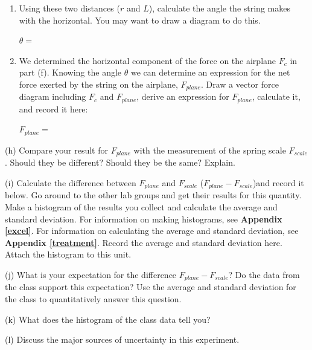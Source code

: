 \begin{enumerate}
\item Using these two distances ($r$ and $L$), 
calculate the angle the string makes with
the horizontal. You may want to draw a diagram to do this. 

\bigskip
\( \theta  =\)  \vspace{5mm}

\item We determined the horizontal component of the force on the airplane 
\( F_{c} \) in part (f). Knowing the angle \( \theta \) we can determine an
expression for the
net force exerted by the string on the airplane, \( F_{plane} \). Draw a vector
force diagram including \( F_{c} \) and \( F_{plane} \), derive an expression
for \( F_{plane} \), calculate it, and record it here: 

\bigskip
\( F_{plane} =\)  \vspace{10mm}

\end{enumerate}
(h) Compare your result for \( F_{plane} \) with the measurement of the spring
scale \( F_{scale} \). Should they be different? Should they be the same? Explain.
\vspace{15mm}


(i) Calculate the difference between \( F_{plane} \) and \( F_{scale} \) (\( F_{plane} - F_{scale} \))and record it below.
Go around to the other lab groups and get their results for this quantity.
Make a histogram of the results you collect and calculate the average and standard deviation.
For information on making histograms, see \textbf{Appendix \ref{excel}}. For information on calculating the average and
standard deviation, see \textbf{Appendix \ref{treatment}}. Record the average and standard deviation here.
Attach the histogram to this unit.
\vspace{30mm}

(j) What is your expectation for the difference \( F_{plane} - F_{scale} \)?
Do the data from the class support this expectation? 
Use the average and standard deviation for the class to quantitatively answer this question.
\vspace{20mm}

(k) What does the histogram of the class data tell you?
\vspace{20mm}

(l) Discuss the major sources of uncertainty in this experiment.
\vspace{15mm}

